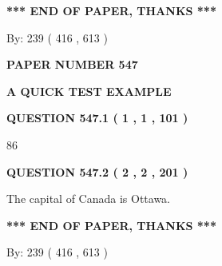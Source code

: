 \documentclass[12pt]{article}
\begin{document}
\vspace{1.0in} 
{\textbf{\large{ *** END OF PAPER, THANKS *** }}} 
   
   
\hspace{1.0in} By: 
 239 ( 416 ,  613 )
   
   
   
   
\newpage 
\setcounter{page}{ 
   547001 } 
   
   
   
   
 {\textbf{ \Large{ PAPER NUMBER  547  }}}
   
   
\vspace{0.2in}
   
   
   
   
   
   
 \vspace{0.2in}
{\LARGE {\textbf{ A QUICK TEST EXAMPLE}}}
   
   
  
\vspace{0.2in}
  
{\textbf{\Large{QUESTION
547.1 
 ( 1 , 1 , 101 )
}}}
  
  
 
 
\noindent{}

86
 
 
  
\vspace{0.2in}
  
{\textbf{\Large{QUESTION
547.2 
 ( 2 , 2 , 201 )
}}}
  
  
 
 
\noindent{}
 
 
The capital of Canada is Ottawa.
 
 
 
 
   
   
 \vspace{0.2in}
 
   
   
   
   
\vspace{1.0in} 
{\textbf{\large{ *** END OF PAPER, THANKS *** }}} 
   
   
\hspace{1.0in} By: 
 239 ( 416 ,  613 )
   
\end{document}
